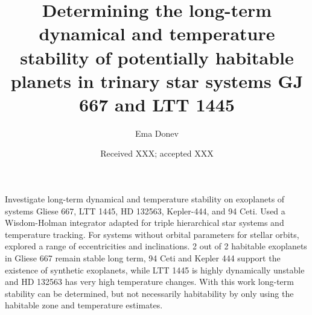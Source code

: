 \documentclass[referee]{aa}
\begin{document}
    \title{Determining the long-term dynamical and temperature stability of potentially habitable planets in trinary star
    systems GJ 667 and LTT 1445}


    
    \author{Ema Donev}

    
    \date{Received XXX; accepted XXX}
    
    \abstract
      {}
      {Investigate long-term dynamical and temperature stability on exoplanets of systems Gliese 667, LTT 1445, HD 132563, Kepler-444, and 94 Ceti.}
      {Used a Wisdom-Holman integrator adapted for triple hierarchical star systems and temperature tracking. For systems without orbital parameters for stellar orbits, explored a range of eccentricities and inclinations.}
      {2 out of 2 habitable exoplanets in Gliese 667 remain stable long term, 94 Ceti and Kepler 444 support the existence of synthetic exoplanets, while LTT 1445 is highly dynamically unstable and HD 132563 has very high temperature changes.}
      {With this work long-term stability can be determined, but not necessarily habitability by only using the habitable zone and temperature estimates.}
    
    
    \maketitle
\end{document}
